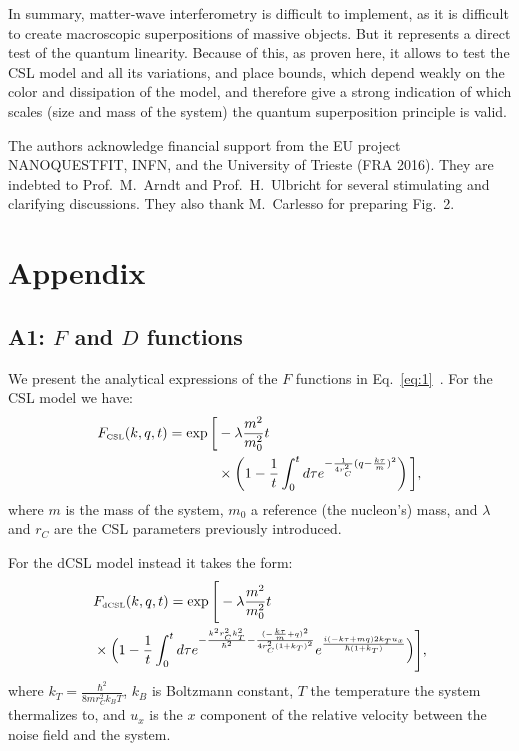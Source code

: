 \documentclass[prl,twocolumn,showpacs,superscriptaddress,groupedaddress]{revtex4}
\begin{document}
In summary, matter-wave interferometry is difficult to implement, as it is difficult to create macroscopic superpositions of massive objects. But it represents a direct test of the quantum linearity. Because of this, as proven here, it allows to test the CSL model and all its variations, and place  bounds, which depend weakly on the color and dissipation of the model, and therefore give a strong indication of which scales (size and mass of the system) the quantum superposition principle is valid.  

The authors acknowledge financial support from the EU project NANOQUESTFIT, INFN, and the University of Trieste (FRA 2016). They are indebted to Prof.~M.~Arndt and Prof.~H.~Ulbricht  for several stimulating and clarifying discussions. They also thank M.~Carlesso for preparing Fig.~2.


\section*{Appendix}

\subsection*{A1: $F$ and $D$ functions}
We present the analytical expressions of the $F$ functions in Eq.~\eqref{eq:1}~\cite{matterwave}. For the CSL model we have: 
\begin{equation}
\begin{split}
F_{\text{\tiny CSL}}(k,q,t)= \exp\bigg[&-\lambda \frac{m^2}{m_0^2} t \\
&\times\left(1-\frac{1}{t}\int_0^t d\tau e^{-\frac{1}{4r_C^2}(q-\frac{k\tau}{m})^2} \right) \bigg],
\end{split}
\end{equation}
where $m$ is the mass of the system, $m_0$ a reference (the nucleon's) mass, and $\lambda$ and $r_C$ are the CSL parameters previously introduced. 

For the dCSL model instead it takes the form:
\begin{equation}
\begin{split}
&F_{\text{\tiny dCSL}}(k,q,t)= \exp\Bigg[-\lambda \frac{m^2}{m_0^2} t \\ 
&\times \Big(1-\frac{1}{t} \int_0^t d\tau e^{-\frac{k^2r_C^2 k_T^2 }{\hbar^2} 
-\frac{(-\frac{k\tau}{m}+q)^2}{4r_C^2 (1+k_T)^2}}
e^{\frac{i(-k\tau+m q) 2k_T u_x }{\hbar(1+k_T)}}  \Big) \Bigg],
\end{split}
\end{equation}
where $k_T=\frac{\hbar^2}{8 m r_C^2 k_B T}$, $k_B$ is Boltzmann constant, $T$ the temperature the system thermalizes to, and $u_x$ is the $x$ component of the relative velocity between the noise field and the system. 
\end{document}
